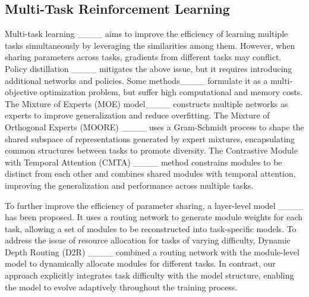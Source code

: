 \subsection{Multi-Task Reinforcement Learning}
Multi-task learning ____ aims to improve the efficiency of learning multiple tasks simultaneously by leveraging the similarities among them. 
However, when sharing parameters across tasks, gradients from different tasks may conflict. 
Policy distillation ____ mitigates the above issue, but it requires introducing additional networks and policies. 
Some methods____ formulate it as a multi-objective optimization problem, but suffer high computational and memory costs.
The Mixture of Experts (MOE) model____ constructs multiple networks as experts to improve generalization and reduce overfitting.
The Mixture of Orthogonal Experts (MOORE)
____ uses a Gram-Schmidt process to shape the shared subspace of representations generated by expert mixtures, encapsulating common structures between tasks to promote diversity.
The Contrastive Module with Temporal Attention (CMTA) ____ method constrains modules to be distinct from each other and combines shared modules with temporal attention, improving the generalization and performance across multiple tasks.

To further improve the efficiency of parameter sharing, a layer-level model ____ has been proposed. It uses a routing network to generate module weights for each task, allowing a set of modules to be reconstructed into task-specific models.
To address the issue of resource allocation for tasks of varying difficulty, Dynamic Depth Routing (D2R) ____ combined a routing network with the module-level model to dynamically allocate modules for different tasks. 
In contrast, our approach explicitly integrates task difficulty with the model structure, enabling the model to evolve adaptively throughout the training process.